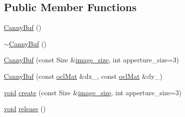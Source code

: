 \subsection*{Public Member Functions}
\begin{DoxyCompactItemize}
\item 
\hyperlink{structcv_1_1ocl_1_1CannyBuf_a9b1c606fab869c5f937b29519a581ed0}{Canny\-Buf} ()
\item 
\hyperlink{structcv_1_1ocl_1_1CannyBuf_a739ca08f078ed6db8d1134faf8d97b3e}{$\sim$\-Canny\-Buf} ()
\item 
\hyperlink{structcv_1_1ocl_1_1CannyBuf_a39fdab89bdc78e7485f5821269301c8e}{Canny\-Buf} (const Size \&\hyperlink{calib3d_8hpp_a3c5695da25794e723582c8b5ccff544c}{image\-\_\-size}, int apperture\-\_\-size=3)
\item 
\hyperlink{structcv_1_1ocl_1_1CannyBuf_ad72bf80943ac0019f8465729067f329c}{Canny\-Buf} (const \hyperlink{classcv_1_1ocl_1_1oclMat}{ocl\-Mat} \&dx\-\_\-, const \hyperlink{classcv_1_1ocl_1_1oclMat}{ocl\-Mat} \&dy\-\_\-)
\item 
\hyperlink{legacy_8hpp_a8bb47f092d473522721002c86c13b94e}{void} \hyperlink{structcv_1_1ocl_1_1CannyBuf_a148cae508221cef4ccdc53a9317306e6}{create} (const Size \&\hyperlink{calib3d_8hpp_a3c5695da25794e723582c8b5ccff544c}{image\-\_\-size}, int apperture\-\_\-size=3)
\item 
\hyperlink{legacy_8hpp_a8bb47f092d473522721002c86c13b94e}{void} \hyperlink{structcv_1_1ocl_1_1CannyBuf_a04efbe17f9703e55996ebd8a5ac9dd7a}{release} ()
\end{DoxyCompactItemize}
